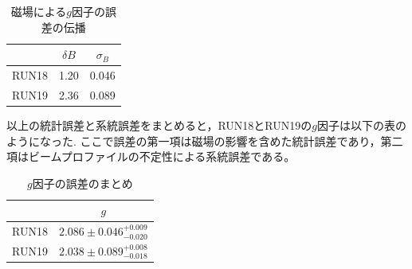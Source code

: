 \begin{table}[H]%
  \caption{磁場による$g$因子の誤差の伝播}
  \centering
    \begin{tabular}{ccc}\toprule
      & $\delta B$ &  $\sigma_{B}$  \\ \midrule
      RUN18 & 1.20 & 0.046  \\
      RUN19 & 2.36 & 0.089 \\ \bottomrule
    \end{tabular}
    \label{tab:g_error}
\end{table}

以上の統計誤差と系統誤差をまとめると，RUN18とRUN19の$g$因子は以下の表のようになった.
ここで誤差の第一項は磁場の影響を含めた統計誤差であり，第二項はビームプロファイルの不定性による系統誤差である。

\begin{table}[H]%
  \caption{$g$因子の誤差のまとめ}
  \centering
  \begingroup
  \renewcommand{\arraystretch}{1.2}%
  \begin{tabular}{cc}\toprule
    &   $g$  \\ \midrule
    RUN18 & $2.086 \pm 0.046^{+0.009}_{-0.020} $  \\
    RUN19 & $2.038 \pm 0.089^{+0.008}_{-0.018} $  \\ \bottomrule
  \end{tabular}
  \endgroup
\end{table}

%
